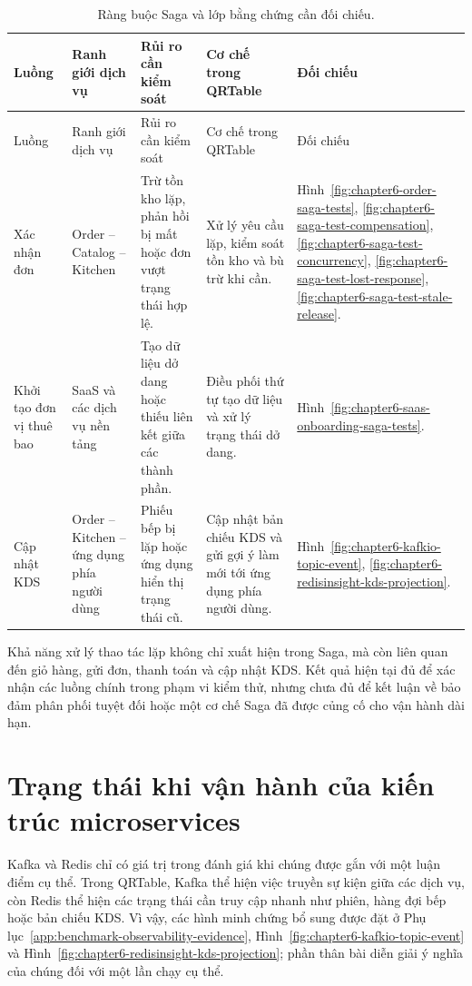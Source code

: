 {\scriptsize\sloppy
\setlength{\tabcolsep}{2pt}
\begin{longtable}{>{\raggedright\arraybackslash}p{}>{\raggedright\arraybackslash}p{}>{\raggedright\arraybackslash}p{}>{\raggedright\arraybackslash}p{}>{\raggedright\arraybackslash}p{}}
  \caption{Ràng buộc Saga và lớp bằng chứng cần đối chiếu.}
  \label{tab:chapter6-saga-invariants}\\
  \toprule
  Luồng & Ranh giới dịch vụ & Rủi ro cần kiểm soát & Cơ chế trong QRTable & Đối chiếu \\
  \midrule
  \endfirsthead
  \toprule
  Luồng & Ranh giới dịch vụ & Rủi ro cần kiểm soát & Cơ chế trong QRTable & Đối chiếu \\
  \midrule
  \endhead
  \bottomrule
  \endfoot
  Xác nhận đơn & Order -- Catalog -- Kitchen & Trừ tồn kho lặp, phản hồi bị mất hoặc đơn vượt trạng thái hợp lệ. & Xử lý yêu cầu lặp, kiểm soát tồn kho và bù trừ khi cần. & Hình~\ref{fig:chapter6-order-saga-tests}, \ref{fig:chapter6-saga-test-compensation}, \ref{fig:chapter6-saga-test-concurrency}, \ref{fig:chapter6-saga-test-lost-response}, \ref{fig:chapter6-saga-test-stale-release}. \\
  Khởi tạo đơn vị thuê bao & SaaS và các dịch vụ nền tảng & Tạo dữ liệu dở dang hoặc thiếu liên kết giữa các thành phần. & Điều phối thứ tự tạo dữ liệu và xử lý trạng thái dở dang. & Hình~\ref{fig:chapter6-saas-onboarding-saga-tests}. \\
  Cập nhật KDS & Order -- Kitchen -- ứng dụng phía người dùng & Phiếu bếp bị lặp hoặc ứng dụng hiển thị trạng thái cũ. & Cập nhật bản chiếu KDS và gửi gợi ý làm mới tới ứng dụng phía người dùng. & Hình~\ref{fig:chapter6-kafkio-topic-event}, \ref{fig:chapter6-redisinsight-kds-projection}. \\
\end{longtable}
}


Khả năng xử lý thao tác lặp không chỉ xuất hiện trong Saga, mà còn liên quan đến giỏ hàng, gửi đơn, thanh toán và cập nhật KDS. Kết quả hiện tại đủ để xác nhận các luồng chính trong phạm vi kiểm thử, nhưng chưa đủ để kết luận về bảo đảm phân phối tuyệt đối hoặc một cơ chế Saga đã được củng cố cho vận hành dài hạn.

\section{Trạng thái khi vận hành của kiến trúc microservices}

Kafka và Redis chỉ có giá trị trong đánh giá khi chúng được gắn với một luận điểm cụ thể. Trong QRTable, Kafka thể hiện việc truyền sự kiện giữa các dịch vụ, còn Redis thể hiện các trạng thái cần truy cập nhanh như phiên, hàng đợi bếp hoặc bản chiếu KDS. Vì vậy, các hình minh chứng bổ sung được đặt ở Phụ lục~\ref{app:benchmark-observability-evidence}, Hình~\ref{fig:chapter6-kafkio-topic-event} và Hình~\ref{fig:chapter6-redisinsight-kds-projection}; phần thân bài diễn giải ý nghĩa của chúng đối với một lần chạy cụ thể.

